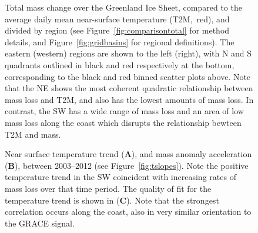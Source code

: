 \documentclass[11pt]{report}
\begin{document}
 \begin{figure}[h]
\centering
{}
\caption[Comparison of Regional Mass Loss with T2M: 2003--2012]{Total mass change over the Greenland Ice Sheet, compared to the average daily mean near-surface temperature (T2M,~red), and divided by region (see Figure~\ref{fig:comparisontotal} for method details, and Figure~\ref{fig:gridbasins} for regional definitions). The eastern (western) regions are shown to the left (right), with N and S quadrants outlined in black and red respectively at the bottom, corresponding to the black and red binned scatter plots above. Note that the NE shows the most coherent quadratic relationship between mass loss and T2M, and also has the lowest amounts of mass loss. In contrast, the SW has a wide range of mass loss and an area of low mass loss along the coast which disrupts the relationship bewteen T2M and mass.} \label{fig:comparisonregions}
\end{figure}



 \begin{figure}[h]
\centering
{}
\caption[Near Surface Temperature and Mass Anomaly Trends: 2003--2012]{Near surface temperature trend (\textbf{A}), and mass anomaly acceleration (\textbf{B}), between 2003--2012 (see Figure~\ref{fig:tslopes}). Note the positive temperature trend in the SW coincident with increasing rates of mass loss over that time period. The quality of fit for the temperature trend is shown in (\textbf{C}). Note that the strongest correlation occurs along the coast, also in very similar orientation to the GRACE signal.
} \label{fig:tslopesSummer}
\end{figure}
\end{document}
